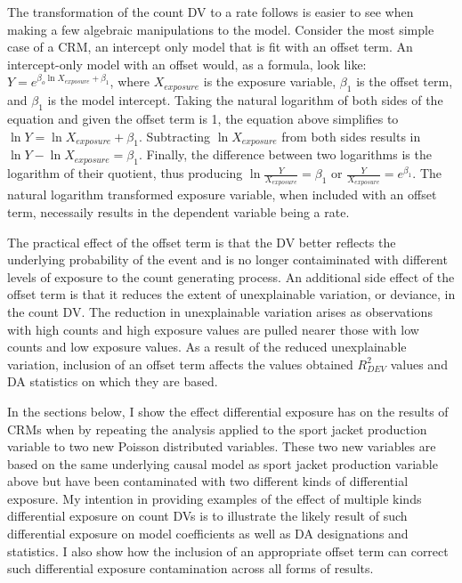 \documentclass[ShortAfour,times,sageapa]{sagej}
\begin{document}
	The transformation of the count DV to a rate follows is easier to see when making a few algebraic manipulations to the model.
	Consider the most simple case of a CRM, an intercept only model that is fit with an offset term.
	An intercept-only model with an offset would, as a formula, look like: $Y = e^{\beta_o\ln X_{exposure} + \beta_1}$, where $X_{exposure}$ is the exposure variable, $\beta_1$ is the offset term, and $\beta_1$ is the model intercept.
	Taking the natural logarithm of both sides of the equation and given the offset term is 1, the equation above simplifies to $\ln Y = \ln X_{exposure} + \beta_1$.
	Subtracting $\ln X_{exposure}$ from both sides results in $\ln Y - \ln X_{exposure} = \beta_1$.
	Finally, the difference between two logarithms is the logarithm of their quotient, thus producing $\ln \frac{Y}{X_{exposure}} = \beta_1$ or $\frac{Y}{X_{exposure}} = e^{\beta_1}$.
	The natural logarithm transformed exposure variable, when included with an offset term, necessaily results in the dependent variable being a rate.
	
	The practical effect of the offset term is that the DV better reflects the underlying probability of the event and is no longer contaiminated with different levels of exposure to the count generating process.
	An additional side effect of the offset term is that it reduces the extent of unexplainable variation, or deviance, in the count DV.
	The reduction in unexplainable variation arises as observations with high counts and high exposure values are pulled nearer those with low counts and low exposure values.	
	As a result of the reduced unexplainable variation, inclusion of an offset term affects the values obtained $R^2_{DEV}$ values and DA statistics on which they are based.
	
	In the sections below, I show the effect differential exposure has on the results of CRMs when by repeating the analysis applied to the sport jacket production variable to two new Poisson distributed variables.
	These two new variables are based on the same underlying causal model as sport jacket production variable above but have been contaminated with two different kinds of differential exposure.
	My intention in providing examples of the effect of multiple kinds differential exposure on count DVs is to illustrate the likely result of such differential exposure on model coefficients as well as DA designations and statistics.
	I also show how the inclusion of an appropriate offset term can correct such differential exposure contamination across all forms of results.
	
\end{document}
